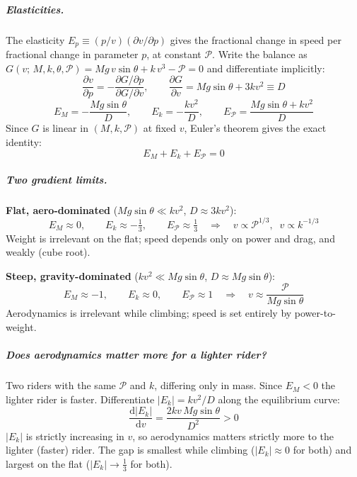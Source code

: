 \begin{aiblock}
\subparagraph{Elasticities.}
The elasticity $E_p \equiv (p/v)(\partial v/\partial p)$ gives the fractional change in speed per
fractional change in parameter $p$, at constant $\mathcal{P}$. Write the balance as
$G(v;\,M,k,\theta,\mathcal{P}) = Mg\,v\sin\theta + k\,v^3 - \mathcal{P} = 0$ and
differentiate implicitly:
\begin{equation}
    \frac{\partial v}{\partial p} = -\frac{\partial G/\partial p}{\partial G/\partial v},
    \qquad
    \frac{\partial G}{\partial v} = Mg\sin\theta + 3kv^2 \equiv D
\end{equation}
\begin{equation}
    \boxed{E_M = -\frac{Mg\sin\theta}{D}, \qquad
           E_k = -\frac{kv^2}{D}, \qquad
           E_{\mathcal{P}} = \frac{Mg\sin\theta + kv^2}{D}}
\end{equation}
Since $G$ is linear in $(M, k, \mathcal{P})$ at fixed $v$, Euler's theorem gives the exact identity:
\begin{equation}
    E_M + E_k + E_{\mathcal{P}} = 0
\end{equation}

\subparagraph{Two gradient limits.}
\textbf{Flat, aero-dominated} ($Mg\sin\theta \ll kv^2$, $D \approx 3kv^2$):
\begin{equation}
    E_M \approx 0, \qquad E_k \approx -\tfrac{1}{3}, \qquad E_{\mathcal{P}} \approx \tfrac{1}{3}
    \quad\Longrightarrow\quad v \propto \mathcal{P}^{1/3},\;\; v \propto k^{-1/3}
\end{equation}
Weight is irrelevant on the flat; speed depends only on power and drag, and weakly (cube root).

\textbf{Steep, gravity-dominated} ($kv^2 \ll Mg\sin\theta$, $D \approx Mg\sin\theta$):
\begin{equation}
    E_M \approx -1, \qquad E_k \approx 0, \qquad E_{\mathcal{P}} \approx 1
    \quad\Longrightarrow\quad v \approx \frac{\mathcal{P}}{Mg\sin\theta}
\end{equation}
Aerodynamics is irrelevant while climbing; speed is set entirely by power-to-weight.

\subparagraph{Does aerodynamics matter more for a lighter rider?}
Two riders with the same $\mathcal{P}$ and $k$, differing only in mass. Since $E_M < 0$ the
lighter rider is faster. Differentiate $|E_k| = kv^2/D$ along the equilibrium curve:
\begin{equation}
    \frac{\mathrm{d}|E_k|}{\mathrm{d}v} = \frac{2kv\,Mg\sin\theta}{D^2} > 0
\end{equation}
$|E_k|$ is strictly increasing in $v$, so aerodynamics matters strictly more to the lighter
(faster) rider. The gap is smallest while climbing ($|E_k|\approx 0$ for both) and largest on
the flat ($|E_k|\to\tfrac{1}{3}$ for both).


\end{aiblock}
